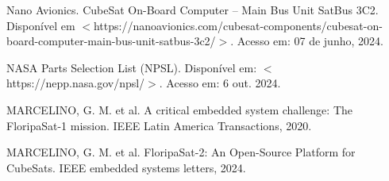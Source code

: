 \begin{flushleft}
\begin{thebibliography}{00}
 Nano Avionics. CubeSat On-Board Computer – Main Bus Unit SatBus 3C2. Disponível em $<$https://nanoavionics.com/cubesat-components/cubesat-on-board-computer-main-bus-unit-satbus-3c2/$>$. Acesso em: 07 de junho, 2024.

 NASA Parts Selection List (NPSL). Disponível em: $<$https://nepp.nasa.gov/npsl/$>$. Acesso em: 6 out. 2024.

 MARCELINO, G. M. et al. A critical embedded system challenge: The FloripaSat-1 mission. IEEE Latin America Transactions, 2020.

 MARCELINO, G. M. et al. FloripaSat-2: An Open-Source Platform for CubeSats. IEEE embedded systems letters, 2024.




\end{thebibliography}
\end{flushleft}

